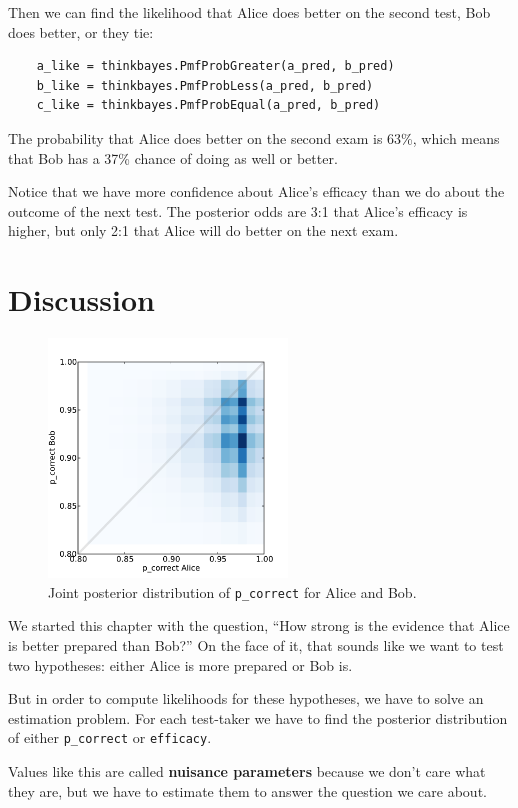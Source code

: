 \documentclass[12pt]{book}
\begin{document}
Then we can find the likelihood that Alice does better on the second
test, Bob does better, or they tie:

\begin{verbatim}
    a_like = thinkbayes.PmfProbGreater(a_pred, b_pred)
    b_like = thinkbayes.PmfProbLess(a_pred, b_pred)
    c_like = thinkbayes.PmfProbEqual(a_pred, b_pred)
\end{verbatim}

The probability that Alice does better on the second exam is 63\%,
which means that Bob has a 37\% chance of doing as well or better.

Notice that we have more confidence about Alice's efficacy than we do
about the outcome of the next test.  The posterior odds are 3:1 that
Alice's efficacy is higher, but only 2:1 that Alice will do better on
the next exam.


\section{Discussion}

\begin{figure}
\centerline{\includegraphics[height=2.5in]{figs/sat_joint.pdf}}
\caption{Joint posterior distribution of {\tt p\_correct} for Alice and Bob.}
\label{fig.satjoint}
\end{figure}

We started this chapter with the question,
``How strong is the evidence that Alice is better prepared
than Bob?''  On the face of it, that sounds like we want to
test two hypotheses: either Alice is more prepared or Bob is.

But in order to compute likelihoods for these hypotheses, we
have to solve an estimation problem.  For each test-taker
we have to find the posterior distribution of either
\verb"p_correct" or \verb"efficacy".

Values like this are called {\bf nuisance parameters} because
we don't care what they are, but we have
to estimate them to answer the question we care about.
\end{document}
